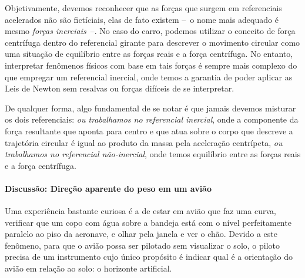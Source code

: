 Objetivamente, devemos reconhecer que as forças que surgem em referenciais acelerados não são fictíciais, elas de fato existem --~o nome mais adequado é mesmo \emph{forças inerciais}~--. No caso do carro, podemos utilizar o conceito de força centrífuga dentro do referencial girante para descrever o movimento circular como uma situação de equilíbrio entre as forças reais e a força centrífuga. No entanto, interpretar fenômenos físicos com base em tais forças é sempre mais complexo do que empregar um referencial inercial, onde temos a garantia de poder aplicar as Leis de Newton sem resalvas ou forças difíceis de se interpretar.

De qualquer forma, algo fundamental de se notar é que jamais devemos misturar os dois referenciais: \emph{ou trabalhamos no referencial inercial}, onde a componente da força resultante que aponta para centro e que atua sobre o corpo que descreve a trajetória circular é igual ao produto da massa pela aceleração centrípeta, \emph{ou trabalhamos no referencial não-inercial}, onde temos equilíbrio entre as forças reais e a força centrífuga.

\paragraph{Discussão: Direção aparente do peso em um avião}

Uma experiência bastante curiosa é a de estar em avião que faz uma curva, verificar que um copo com água sobre a bandeja está com o nível perfeitamente paralelo ao piso da aeronave, e olhar pela janela e ver o chão. Devido a este fenômeno, para que o avião possa ser pilotado sem visualizar o solo, o piloto precisa de um instrumento cujo único propósito é indicar qual é a orientação do avião em relação ao solo: o horizonte artificial.

